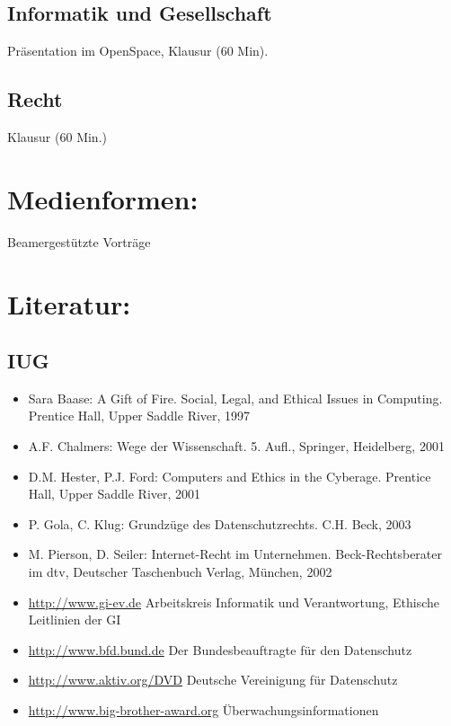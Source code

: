 \subsection{Informatik und
Gesellschaft}\label{informatik-und-gesellschaft-1}

Präsentation im OpenSpace, Klausur (60 Min).

\subsection{Recht}\label{recht-1}

Klausur (60 Min.)

\section{Medienformen:}\label{medienformen-16}

Beamergestützte Vorträge

\section{Literatur:}\label{literatur-16}

\subsection{IUG}\label{iug}

\begin{itemize}
\tightlist
\item
  Sara Baase: A Gift of Fire. Social, Legal, and Ethical Issues in
  Computing. Prentice Hall, Upper Saddle River, 1997
\item
  A.F. Chalmers: Wege der Wissenschaft. 5. Aufl., Springer, Heidelberg,
  2001
\item
  D.M. Hester, P.J. Ford: Computers and Ethics in the Cyberage. Prentice
  Hall, Upper Saddle River, 2001
\item
  P. Gola, C. Klug: Grundzüge des Datenschutzrechts. C.H. Beck, 2003
\item
  M. Pierson, D. Seiler: Internet-Recht im Unternehmen.
  Beck-Rechtsberater im dtv, Deutscher Taschenbuch Verlag, München, 2002
\item
  \url{http://www.gi-ev.de} Arbeitskreis Informatik und Verantwortung,
  Ethische Leitlinien der GI
\item
  \url{http://www.bfd.bund.de} Der Bundesbeauftragte für den Datenschutz
\item
  \url{http://www.aktiv.org/DVD} Deutsche Vereinigung für Datenschutz
\item
  \url{http://www.big-brother-award.org} Überwachungsinformationen
\end{itemize}

